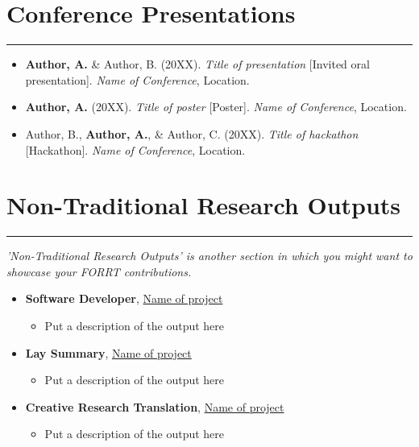 \documentclass{article}
\begin{document}
\section*{Conference Presentations}
\hrule
\vspace{1em}

\begin{itemize}[leftmargin=*]
    \item[] \textbf{Author, A.} \& Author, B. (20XX). \textit{Title of presentation} [Invited oral presentation]. \textit{Name of Conference}, Location.

    \item[] \textbf{Author, A.} (20XX). \textit{Title of poster} [Poster]. \textit{Name of Conference}, Location.

    \item[] Author, B., \textbf{Author, A.}, \& Author, C. (20XX). \textit{Title of hackathon} [Hackathon]. \textit{Name of Conference}, Location.
\end{itemize}

\section*{Non-Traditional Research Outputs}
\hrule
\vspace{1em}
\textit{'Non-Traditional Research Outputs' is another section in which you might want to showcase your FORRT contributions.}

\begin{itemize}[leftmargin=*]

    \item[] \textbf{Software Developer}, \href{https://nameofproject.com}{Name of project}
    \begin{itemize}
        \item Put a description of the output here
    \end{itemize}

    \item[] \textbf{Lay Summary}, \href{https://nameofproject.com}{Name of project}
    \begin{itemize}
        \item Put a description of the output here
    \end{itemize}

    \item[] \textbf{Creative Research Translation}, \href{https://nameofproject.com}{Name of project}
    \begin{itemize}
        \item Put a description of the output here
    \end{itemize}
\end{itemize}
\end{document}
